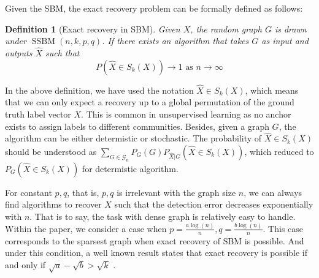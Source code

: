 \documentclass[journal]{IEEEtran}
\newtheorem{definition}{Definition}
\newcommand{\A}{\frac{a \log(n)}{n}}
\newcommand{\B}{\frac{b \log(n)}{n}}
\newcommand{\cG}{\mathcal{G}}
\newcommand{\1}{\mathbbm{1}}
\DeclareMathOperator{\SSBM}{SSBM}
\begin{document}
Given the SBM, the exact recovery problem can be formally defined as follows:
\begin{definition}[Exact recovery in SBM] \label{def:SSBMR}
Given $X$, the random graph $G$ is drawn under $\SSBM(n,k,p,q)$. If there exists an algorithm that takes
$G$ as input and outputs $\hat{X}$ such that
\begin{equation*}
P(\hat{X} \in S_k(X)) \to 1 \textrm{ as } n \to \infty
\end{equation*}
\end{definition}

In the above definition, we have used the notation $\hat{X} \in S_k(X)$, which means that we can only
expect a recovery up to a global permutation of the ground truth label vector $X$. This is common in unsupervised
learning as no anchor exists to assign labels to different communities. Besides, given a graph $G$, the algorithm can
be either determistic or stochastic. The probability of $\hat{X} \in S_k(X)$ should be understood as 
$\sum_{G \in \cG_n} P_G(G) P_{\hat{X}|G}(\hat{X} \in S_k(X))$, which reduced to 
$P_G(\hat{X} \in S_k(X))$ for determistic algorithm.

For constant $p,q$, that is, $p,q$ is irrelevant with the graph size $n$,
we can always find algorithms to recover $X$ such that the detection error decreases exponentially with $n$.
That is to say, the task with dense graph is relatively easy to handle. Within the paper, we consider a case
when $p = \A, q = \B$. This case corresponds to the sparsest graph when exact recovery of SBM is possible.
And under this condition, a well known result states that
exact recovery is possible if and only if $\sqrt{a} - \sqrt{b} > \sqrt{k}$ \cite{abbe2015community}.
\end{document}
